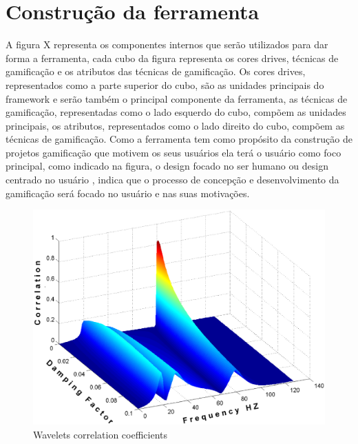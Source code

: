 \section{Construção da ferramenta}

A figura X representa os componentes internos que serão utilizados para dar forma a ferramenta, cada cubo da figura representa os cores drives, técnicas de gamificação e os atributos das técnicas de gamificação. Os cores drives, representados como a parte superior do cubo, são as unidades principais do framework e serão também o principal componente da ferramenta, as técnicas de gamificação, representadas como o lado esquerdo do cubo, compõem as unidades principais, os atributos, representados como o lado direito do cubo, compõem as técnicas de gamificação. Como a ferramenta tem como propósito da construção de projetos gamificação que motivem os seus usuários ela terá o usuário como foco principal, como indicado na figura, o design focado no ser humano \cite{Chou2014} ou design centrado no usuário \cite{JanakiMythilyKumar and Mario Herger}, indica que o processo de concepção e desenvolvimento da gamificação será focado no usuário e nas suas motivações. 

\begin{figure}[h]
	\centering
	\label{fig01}
		\includegraphics[keepaspectratio=true,scale=0.3]{figuras/fig01.eps}
	\caption{Wavelets correlation coefficients}
\end{figure}

